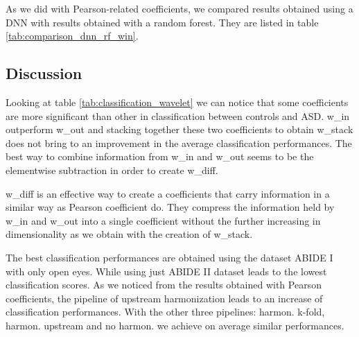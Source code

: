 \documentclass[11pt]{report}
\begin{document}
As we did with Pearson-related coefficients, we compared results obtained using a DNN with results obtained with a random forest. %
They are listed in table \ref{tab:comparison_dnn_rf_win}.


\begin{table}[h!]
        \centering
   \caption{Comparison between AUC scores of a DNN and a RF classifier, using w\_in coefficients, for dataset: ABIDE I+II and ABIDE I with open eyes}
    \label{tab:comparison_dnn_rf_win}
\end{table}

\subsection*{Discussion}
Looking at table \ref{tab:classification_wavelet} we can notice that some coefficients are more significant than other in classification between controls and ASD.
w\_in outperform w\_out and stacking together these two coefficients to obtain w\_stack does not bring to an improvement in the average classification performances.
The best way to combine information from w\_in and w\_out seems to be the elementwise subtraction in order to create w\_diff.

w\_diff is an effective way to create a coefficients that carry information in a similar way as Pearson coefficient do.
They compress the information held by w\_in and w\_out into a single coefficient without the further increasing in dimensionality as we obtain with the creation of w\_stack. 

The best classification performances are obtained using the dataset ABIDE I with only open eyes. While using just ABIDE II dataset leads to the lowest classification scores.
As we noticed from the results obtained with Pearson coefficients, the pipeline of upstream harmonization leads to an increase of classification performances.
With the other three pipelines: harmon. k-fold, harmon. upstream and no harmon. we achieve on average similar performances.
\end{document}
